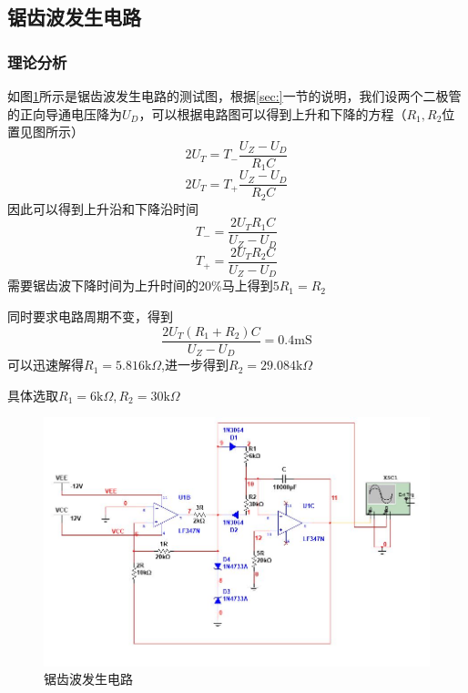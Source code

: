 \documentclass[UTF8,a4paper]{paper}
\begin{document}
\subsection{锯齿波发生电路}
\subsubsection{理论分析}
如图\ref{tanCrit}所示是锯齿波发生电路的测试图，根据\ref{sec:}一节的说明，我们设两个二极管的正向导通电压降为$U_D$，可以根据电路图可以得到上升和下降的方程（$R_1,R_2$位置见图所示）
$$2U_T=T_-\frac{U_Z-U_D}{R_1C}$$
$$2U_T=T_+\frac{U_Z-U_D}{R_2C}$$
因此可以得到上升沿和下降沿时间
$$T_-=\frac{2U_TR_1C}{U_Z-U_D}$$
$$T_+=\frac{2U_TR_2C}{U_Z-U_D}$$
需要锯齿波下降时间为上升时间的20\%马上得到$5R_1=R_2$

同时要求电路周期不变，得到$$\frac{2U_T(R_1+R_2)C}{U_Z-U_D}=0.4\mathrm{mS}$$
可以迅速解得$R_1=5.816\mathrm{k}\Omega$,进一步得到$R_2=29.084\mathrm{k}\Omega$

具体选取$R_1=6\mathrm{k}\Omega,R_2=30\mathrm{k}\Omega$
\begin {figure}
\includegraphics [width=\textwidth]{tan.jpg}
\caption{锯齿波发生电路}
\label{tanCrit}
\end {figure}
\end{document}
